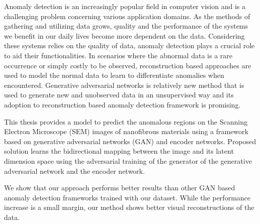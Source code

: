 
\begingroup

Anomaly detection is an increasingly popular field in computer vision and is a challenging 
problem concerning various application domains. As the methods of gathering and utilizing 
data grows, quality and the performance of the systems we benefit in our daily lives become
more dependent on the data. Considering these systems relies on the quality of data, anomaly detection 
plays a crucial role to aid their functionalities. In scenarios where the abnormal data is a rare occurrence 
or simply costly to be observed, reconstruction based approaches are used to model the normal data to learn 
to differentiate anomalies when encountered. Generative adversarial networks is relatively new method 
that is used to generate new and unobserved data in an unsupervised way and its adoption to reconstruction based 
anomaly detection framework is promising.

This thesis provides a model to predict the anomalous regions on the Scanning Electron Microscope (SEM) images 
of nanofibrous materials using a framework based on generative adversarial networks (GAN) and encoder networks. 
Proposed solution learns the bidirectional mapping between the image and its latent dimension space using the adversarial 
training of the generator of the generative adversarial network and the encoder network. 

We show that our approach performs better results than other GAN based anomaly detection frameworks trained with our 
dataset. While the performance increase is a small margin, our method shows better visual reconstructions of the data.
\endgroup